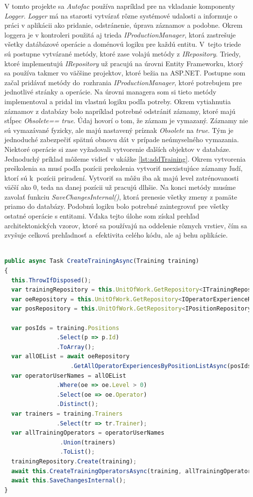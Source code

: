 \documentclass[11pt, oneside]{report}
\begin{document}
V tomto projekte sa \textit{Autofac} používa napríklad pre na vkladanie  komponenty \textit{Logger}. \textit{Logger} má na starosti vytvárať rôzne systémové udalosti a informuje o  práci v aplikácii ako pridanie, odstránenie, úprava záznamov a podobne. Okrem loggera je v kontroleri použitá aj trieda \textit{IProductionManager}, ktorá zastrešuje všetky  datábázové operácie a doménovú logiku pre každú entitu. V~tejto triede sú postupne vytvárané metódy, ktoré zase volajú metódy z \textit{IRepository}. Triedy, ktoré implementujú \textit{IRepository} už pracujú na úrovni Entity Frameworku, ktorý sa používa takmer vo väčšine projektov, ktoré bežia na ASP.NET. Postupne  som začal pridávať metódy do~rozhrania \textit{IProductionManager}, ktoré potrebujem pre  jednotlivé stránky a operácie. Na úrovni managera som si  tieto metódy implementoval a pridal im vlastnú logiku  podľa potreby. Okrem vytiahnutia záznamov z databázy bolo napríklad potrebné odstrániť záznamy, ktoré majú stĺpec \textit{Obsolete== true}. Údaj hovorí o tom, že  záznam je vymazaný. Záznamy nie sú vymazávané fyzicky, ale majú nastavený príznak  \textit{Obsolete} na \textit{true}. Tým je jednoduché zabezpečiť spätnú obnovu dát v prípade neúmyselného vymazania. Niektoré operácie si zase vyžadovali vytvorenie ďalších objektov v databáze. Jednoduchý príklad môžeme vidieť v ukážke \ref{lst:addTraining}. Okrem vytvorenia preškolenia sa musí podľa  pozícii prekolenia vytvoriť neexistujúce záznamy ľudí, ktorí  sú k~pozícii priradení. Vytvoriť sa môžu iba ak majú level zatrénovanosti väčší ako 0, teda na danej pozícii už pracujú dlhšie. Na konci metódy musíme zavolať funkciu \textit{SaveChangesInternal()}, ktorá prenesie všetky zmeny z pamäte  priamo do databázy. Podobnú logiku bolo  potrebné zaintegrovať  pre všetky ostatné operácie s entitami. Vďaka tejto úlohe som získal  prehľad architektonických vzorov, ktoré sa používajú na oddelenie rôznych vrstiev, čím sa zvyšuje celková prehľadnosť a~efektivita celého kódu, ale aj behu aplikácie.\\\\
\begin{lstlisting}[language=Javascript,showstringspaces=false, caption= Implementácia funkcie na pridanie preškolenia,captionpos=b,label={lst:addTraining}]
public async Task CreateTrainingAsync(Training training)
{
  this.ThrowIfDisposed();
  var trainingRepository = this.UnitOfWork.GetRepository<ITrainingRepository>();
  var oeRepository = this.UnitOfWork.GetRepository<IOperatorExperienceRepository>();
  var posRepository = this.UnitOfWork.GetRepository<IPositionRepository>();

  var posIds = training.Positions
  			   .Select(p => p.Id)
  			   .ToArray();
  var allOEList = await oeRepository
  		           .GetAllOperatorExperiencesByPositionListAsync(posIds);
  var operatorUserNames = allOEList
  			   .Where(oe => oe.Level > 0)
  			   .Select(oe => oe.Operator)
  			   .Distinct();
  var trainers = training.Trainers
  			   .Select(tr => tr.Trainer);
  var allTrainingOperators = operatorUserNames
  			   	.Union(trainers)
  			   	.ToList();
  trainingRepository.Create(training);
  await this.CreateTrainingOperatorsAsync(training, allTrainingOperators);
  await this.SaveChangesInternal();
}
\end{lstlisting}
\end{document}
